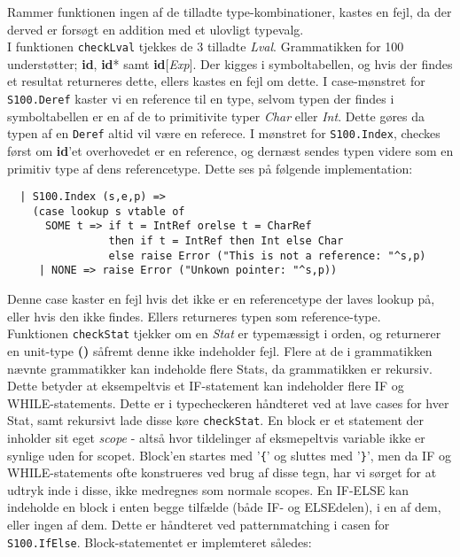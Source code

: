 \documentclass[12pt]{article}
\begin{document}
Rammer funktionen ingen af de tilladte type-kombinationer, kastes en fejl, da der
derved er forsøgt en addition med et ulovligt typevalg. \\

I funktionen \texttt{checkLval} tjekkes de 3 tilladte \textit{Lval}. Grammatikken
for 100 understøtter; \textbf{id}, \textbf{id}* samt \textbf{id}[\textit{Exp}].
Der kigges i symboltabellen, og hvis der findes et resultat returneres
dette, ellers kastes en fejl om dette. I case-mønstret for
\texttt{S100.Deref} kaster vi en reference til en type, selvom typen der
findes i symboltabellen er en af de to primitivite typer \textit{Char} eller
\textit{Int}. Dette gøres da typen af en \texttt{Deref} altid vil være en
referece. I mønstret for \texttt{S100.Index}, checkes først om
\textbf{id}'et overhovedet er en reference, og dernæst sendes typen videre
som en primitiv type af dens referencetype. Dette ses på følgende
implementation: \\

\begin{verbatim}
  | S100.Index (s,e,p) =>
    (case lookup s vtable of
      SOME t => if t = IntRef orelse t = CharRef
                then if t = IntRef then Int else Char
                else raise Error ("This is not a reference: "^s,p)
     | NONE => raise Error ("Unkown pointer: "^s,p))
\end{verbatim}

Denne case kaster en fejl hvis det ikke er en referencetype der laves lookup på, eller hvis den ikke findes. Ellers returneres typen som reference-type.\\

Funktionen \texttt{checkStat} tjekker om en \textit{Stat} er typemæssigt i
orden, og returnerer en unit-type \textbf{()} såfremt denne ikke indeholder
fejl. Flere at de i grammatikken nævnte grammatikker kan indeholde flere Stats,
da grammatikken er rekursiv. Dette betyder at eksempeltvis et IF-statement kan
indeholder flere IF og WHILE-statements. Dette er i typecheckeren håndteret ved
at lave cases for hver Stat, samt rekursivt lade disse køre \texttt{checkStat}.
En block er et statement der inholder sit eget \textit{scope} - altså hvor
tildelinger af eksmepeltvis variable ikke er synlige uden for scopet. Block'en
startes med '\texttt{\{}' og sluttes med '\texttt{\}}', men da IF og
WHILE-statements ofte konstrueres ved brug af disse tegn, har vi sørget for at
udtryk inde i disse, ikke medregnes som normale scopes. En IF-ELSE kan indeholde
en block i enten begge tilfælde (både IF- og ELSEdelen), i en af dem, eller
ingen af dem. Dette er håndteret ved patternmatching i casen for
\texttt{S100.IfElse}. Block-statementet er implemteret således:\\
\end{document}
